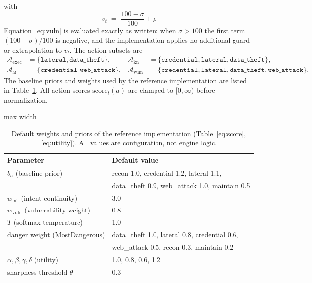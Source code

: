 \documentclass[11pt]{article}
\newcommand{\act}[1]{\texttt{#1}}
\begin{document}
with
\begin{equation}
v_t \;=\; \frac{100-\sigma}{100} + \rho
\label{eq:vuln}
\end{equation}
Equation~\ref{eq:vuln} is evaluated exactly as written: when $\sigma>100$
the first term $(100-\sigma)/100$ is negative, and the implementation
applies no additional guard or extrapolation to $v_t$. The action subsets are
\[
\begin{aligned}
\mathcal{A}_{\mathrm{exec}} &= \{\act{lateral}, \act{data\_theft}\}, &
\mathcal{A}_{\mathrm{kn}} &= \{\act{credential}, \act{lateral}, \act{data\_theft}\},\\
\mathcal{A}_{\mathrm{ai}} &= \{\act{credential}, \act{web\_attack}\}, &
\mathcal{A}_{\mathrm{vuln}} &= \{\act{credential}, \act{lateral}, \act{data\_theft}, \act{web\_attack}\}.
\end{aligned}
\]
The baseline priors and weights used by the reference implementation are
listed in Table~\ref{tab:params}. All action scores
$\mathrm{score}_t(a)$ are clamped to $[0,\infty)$ before normalization.

\begin{table}[ht]
\centering
\begin{adjustbox}{max width=\linewidth}\begin{tabular}{@{}ll@{}}
\toprule
\textbf{Parameter} & \textbf{Default value} \\
\midrule
$b_a$ (baseline prior) & recon 1.0, credential 1.2, lateral 1.1, \\
 & data\_theft 0.9, web\_attack 1.0, maintain 0.5 \\
$w_{\mathrm{int}}$ (intent continuity) & 3.0 \\
$w_{\mathrm{vuln}}$ (vulnerability weight) & 0.8 \\
$T$ (softmax temperature) & 1.0 \\
danger weight (MostDangerous) & data\_theft 1.0, lateral 0.8, credential 0.6, \\
 & web\_attack 0.5, recon 0.3, maintain 0.2 \\
$\alpha,\beta,\gamma,\delta$ (utility) & 1.0, 0.8, 0.6, 1.2 \\
sharpness threshold $\theta$ & 0.3 \\
\bottomrule
\end{tabular}\end{adjustbox}
\caption{Default weights and priors of the reference implementation
(Table~\ref{eq:score}, \ref{eq:utility}). All values are configuration, not
engine logic.}
\label{tab:params}
\end{table}
\end{document}
